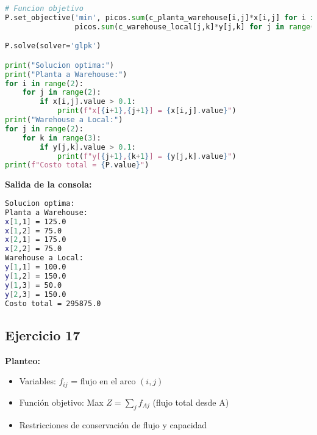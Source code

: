 \documentclass[12pt]{article}
\begin{document}
\begin{lstlisting}[language=Python]
# Funcion objetivo
P.set_objective('min', picos.sum(c_planta_warehouse[i,j]*x[i,j] for i in range(2) for j in range(2)) +
                picos.sum(c_warehouse_local[j,k]*y[j,k] for j in range(2) for k in range(3)))

P.solve(solver='glpk')

print("Solucion optima:")
print("Planta a Warehouse:")
for i in range(2):
    for j in range(2):
        if x[i,j].value > 0.1:
            print(f"x[{i+1},{j+1}] = {x[i,j].value}")
print("Warehouse a Local:")
for j in range(2):
    for k in range(3):
        if y[j,k].value > 0.1:
            print(f"y[{j+1},{k+1}] = {y[j,k].value}")
print(f"Costo total = {P.value}")
\end{lstlisting}

\textbf{Salida de la consola:}
\begin{lstlisting}[language=bash,backgroundcolor=\color{black},basicstyle=\color{white}\ttfamily,numbers=none]
Solucion optima:
Planta a Warehouse:
x[1,1] = 125.0
x[1,2] = 75.0
x[2,1] = 175.0
x[2,2] = 75.0
Warehouse a Local:
y[1,1] = 100.0
y[1,2] = 150.0
y[1,3] = 50.0
y[2,3] = 150.0
Costo total = 295875.0
\end{lstlisting}

\subsection{Ejercicio 17}

\textbf{Planteo:}
\begin{itemize}
\item Variables: $f_{ij}$ = flujo en el arco $(i,j)$
\item Función objetivo: Max $Z = \sum_{j} f_{Aj}$ (flujo total desde A)
\item Restricciones de conservación de flujo y capacidad
\end{itemize}
\end{document}
